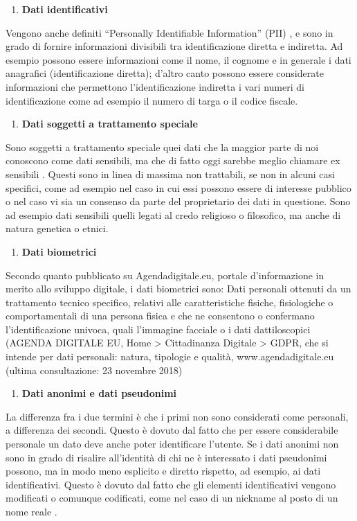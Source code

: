 \begin{enumerate}
\item  \textbf{Dati identificativi}
\end{enumerate}
Vengono anche definiti “Personally Identifiable Information” (PII) , e sono in grado di fornire informazioni divisibili tra identificazione diretta e indiretta. Ad esempio possono essere informazioni come il nome, il cognome e in generale i dati anagrafici (identificazione diretta); d’altro canto possono essere considerate informazioni che permettono l’identificazione indiretta i vari numeri di identificazione come ad esempio il numero di targa o il codice fiscale.
\begin{enumerate}
\item  \textbf{Dati soggetti a trattamento speciale}
\end{enumerate}
Sono soggetti a trattamento speciale quei dati che la maggior parte di noi conoscono come dati sensibili, ma che di fatto oggi sarebbe meglio chiamare ex sensibili . Questi sono in linea di massima non trattabili, se non in alcuni casi specifici, come ad esempio nel caso in cui essi possono essere di interesse pubblico o nel caso vi sia un consenso da parte del proprietario dei dati in questione. Sono ad esempio dati sensibili quelli legati al credo religioso o filosofico, ma anche di natura genetica o etnici. 
\begin{enumerate}
\item  \textbf{Dati biometrici}
\end{enumerate}
Secondo quanto pubblicato su Agendadigitale.eu, portale d’informazione in merito allo sviluppo digitale, i dati biometrici sono:
Dati personali ottenuti da un trattamento tecnico specifico, relativi alle caratteristiche fisiche, fisiologiche o comportamentali di una persona fisica e che ne consentono o confermano l’identificazione univoca, quali l’immagine facciale o i dati dattiloscopici (AGENDA DIGITALE EU, Home > Cittadinanza Digitale > GDPR, che si intende per dati personali: natura, tipologie e qualità, www.agendadigitale.eu (ultima consultazione: 23 novembre 2018) 
\begin{enumerate}
\item  \textbf{Dati anonimi e dati pseudonimi}
\end{enumerate}
La differenza fra i due termini è che i primi non sono considerati come personali, a differenza dei secondi. Questo è dovuto dal fatto che per essere considerabile personale un dato deve anche poter identificare l’utente. Se i dati anonimi non sono in grado di risalire all’identità di chi ne è interessato i dati pseudonimi possono, ma in modo meno esplicito e diretto rispetto, ad esempio, ai dati identificativi. Questo è dovuto dal fatto che gli elementi identificativi vengono modificati o comunque codificati, come nel caso di un nickname al posto di un nome reale .
